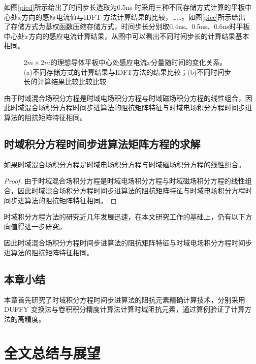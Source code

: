 \documentclass[promaster]{thesis-uestc}
\begin{document}
如图\ref{picd}所示给出了时间步长选取为0.5ns 时采用三种不同存储方式计算的平板中心处$x$方向的感应电流值与IDFT 方法计算结果的比较，……。如图\ref{pice}所示给出了存储方式为基权函数压缩存储方式，时间步长分别取0.4ns、0.5ns、0.6ns时平板中心处$x$方向的感应电流计算结果，从图中可以看出不同时间步长的计算结果基本相同。

\begin{figure}[h]
\caption{$2m\times 2m$的理想导体平板中心处感应电流$x$分量随时间的变化关系。(a)不同存储方式的计算结果与IDFT方法的结果比较；(b)不同时间步长的计算结果比较比较比较}
\label{fig2}
\end{figure}

由于时域混合场积分方程是时域电场积分方程与时域磁场积分方程的线性组合，因此时域混合场积分方程时间步进算法的阻抗矩阵特征与时域电场积分方程时间步进算法的阻抗矩阵特征相同。

\section{时域积分方程时间步进算法矩阵方程的求解}
\begin{theorem}
如果时域混合场积分方程是时域电场积分方程与时域磁场积分方程的线性组合。
\end{theorem}
\begin{proof}
由于时域混合场积分方程是时域电场积分方程与时域磁场积分方程的线性组合，因此时域混合场积分方程时间步进算法的阻抗矩阵特征与时域电场积分方程时间步进算法的阻抗矩阵特征相同。
\end{proof}
\begin{corollary}
时域积分方程方法的研究近几年发展迅速，在本文研究工作的基础上，仍有以下方向值得进一步研究。
\end{corollary}
\begin{lemma}
因此时域混合场积分方程时间步进算法的阻抗矩阵特征与时域电场积分方程时间步进算法的阻抗矩阵特征相同。
\end{lemma}

\section{本章小结}
本章首先研究了时域积分方程时间步进算法的阻抗元素精确计算技术，分别采用DUFFY 变换法与卷积积分精度计算法计算时域阻抗元素，通过算例验证了计算方法的高精度。

\chapter{全文总结与展望}
\end{document}

